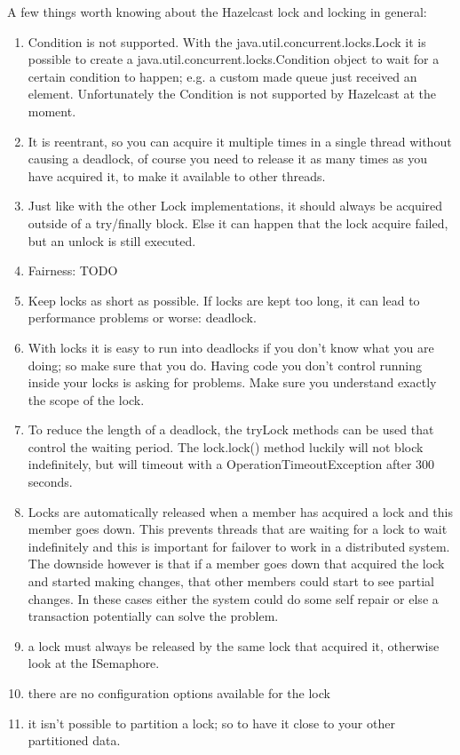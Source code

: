 A few things worth knowing about the Hazelcast lock and locking in general:
\begin{enumerate}
\item Condition is not supported. With the java.util.concurrent.locks.Lock it is possible to create a java.util.concurrent.locks.Condition object to wait for a certain condition to happen; e.g. a custom made queue just received an element. Unfortunately the Condition is not supported by Hazelcast at the moment.
\item It is reentrant, so you can acquire it multiple times in a single thread without causing a deadlock, of course you need to release it as many times as you have acquired it, to make it available to other threads.
\item Just like with the other Lock implementations, it should always be acquired outside of a try/finally block. Else it can happen that the lock acquire failed, but an unlock is still executed. 
\item Fairness: TODO
\item Keep locks as short as possible. If locks are kept too long, it can lead to performance problems or worse: deadlock.
\item With locks it is easy to run into deadlocks if you don't know what you are doing; so make sure that you do. Having code you don't control running inside your locks is asking for problems. Make sure you understand exactly the scope of the lock. 
\item To reduce the length of a deadlock, the tryLock methods can be used that control the waiting period. The lock.lock() method luckily will not block indefinitely, but will timeout with a OperationTimeoutException after 300 seconds.  
\item Locks are automatically released when a member has acquired a lock and this member goes down. This prevents threads that are waiting for a lock to wait indefinitely and this is important for failover to work in a distributed system. The downside however is that if a member goes down that acquired the lock and started making changes, that other members could start to see partial changes. In these cases either the system could do some self repair or else a transaction potentially can solve the problem.
\item a lock must always be released by the same lock that acquired it, otherwise look at the ISemaphore.
\item there are no configuration options available for the lock
\item it isn't possible to partition a lock; so to have it close to your other partitioned data.
\end{enumerate}

